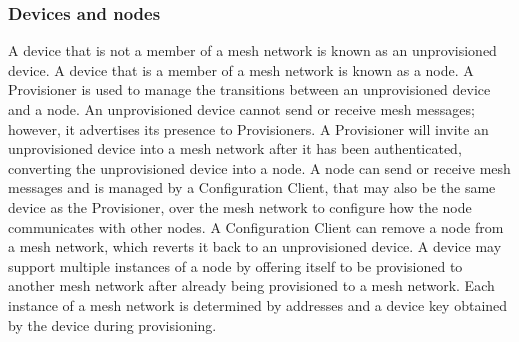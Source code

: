 \documentclass[\main/main.tex]{subfiles}
\begin{document}
\subsubsection{Devices and nodes}
A device that is not a member of a mesh network is known as an unprovisioned device. A device that is a member of a mesh network is known as a node. A Provisioner is used to manage the transitions between an unprovisioned device and a node.
\newline\newline
An unprovisioned device cannot send or receive mesh messages; however, it advertises its presence to Provisioners. A Provisioner will invite an unprovisioned device into a mesh network after it has been authenticated, converting the unprovisioned device into a node.
\newline\newline
A node can send or receive mesh messages and is managed by a Configuration Client, that may also be the same device as the Provisioner, over the mesh network to configure how the node communicates with other nodes. A Configuration Client can remove a node from a mesh network, which reverts it back to an unprovisioned device.
\newline\newline
A device may support multiple instances of a node by offering itself to be provisioned to another mesh network after already being provisioned to a mesh network. Each instance of a mesh network is determined by addresses and a device key obtained by the device during provisioning.
\end{document}
